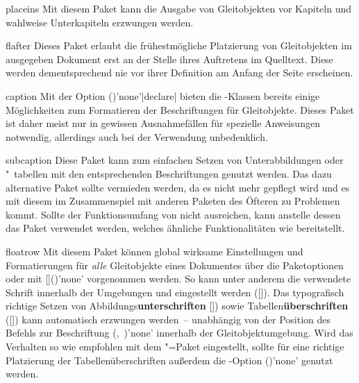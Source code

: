 \begin{packages}
\item[placeins]
  Mit diesem Paket kann die Ausgabe von Gleitobjekten vor Kapiteln und wahlweise
  Unterkapiteln erzwungen werden.
\item[flafter]
  Dieses Paket erlaubt die frühestmögliche Platzierung von Gleitobjekten im 
  ausgegeben Dokument erst an der Stelle ihres Auftretens im Quelltext. Diese 
  werden dementsprechend nie vor ihrer Definition am Anfang der Seite 
  erscheinen.
\item[caption]
  Mit der Option ()'none'|declare| 
  bieten die \KOMAScript-Klassen bereits einige Möglichkeiten zum Formatieren 
  der Beschriftungen für Gleitobjekte. Dieses Paket ist daher meist nur in 
  gewissen Ausnahmefällen für spezielle Anweisungen notwendig, allerdings auch 
  bei der Verwendung unbedenklich.
\item[subcaption]
  Diese Paket kann zum einfachen Setzen von Unterabbildungen oder "~tabellen 
  mit den entsprechenden Beschriftungen genutzt werden. Das dazu alternative 
  Paket  sollte vermieden werden, da es nicht mehr gepflegt 
  wird und es mit diesem im Zusammenspiel mit anderen Paketen des Öfteren zu 
  Problemen kommt. Sollte der Funktionsumfang von  nicht 
  ausreichen, kann anstelle dessen das Paket  verwendet 
  werden, welches ähnliche Funktionalitäten wie  bereitstellt.
\item[floatrow]
  Mit diesem Paket können global wirksame Einstellungen und Formatierungen für 
  \emph{alle} Gleitobjekte eines Dokumentes über die Paketoptionen oder mit 
  [\PParameter{\dots}]()'none' 
  vorgenommen werden. So kann unter anderem die verwendete Schrift innerhalb 
  der Umgebungen  und  eingestellt 
  werden ([]). Das typografisch 
  richtige Setzen von Abbildungs\textbf{unterschriften} 
  [])
  sowie Tabellen\textbf{überschriften} 
  ([])
  kann automatisch erzwungen werden~-- unabhängig von der Position des Befehls 
  zur Beschriftung 
  (,~)'none' 
  innerhalb der Gleitobjektumgebung. Wird das Verhalten so wie empfohlen mit 
  dem "=Paket eingestellt, sollte für eine richtige 
  Platzierung der Tabellenüberschriften außerdem die \KOMAScript-Option 
  ()'none'
  genutzt werden.
%
\end{packages}


